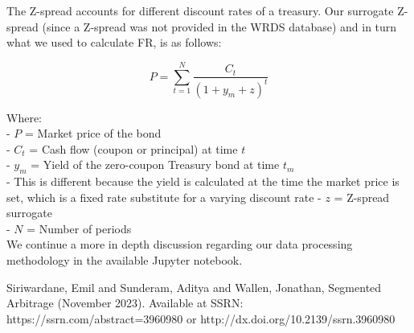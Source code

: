 \documentclass[12pt]{article}
\begin{document}
The Z-spread accounts for different discount rates of a treasury. 
Our surrogate Z-spread (since a Z-spread was not provided in the WRDS database)
and in turn what we used to calculate FR, is as follows:

\begin{equation}
P = \sum_{t=1}^{N} \frac{C_t}{(1 + y_m + z)^t}
\end{equation}

Where: \\
- $P$ = Market price of the bond \\
- $C_t$ = Cash flow (coupon or principal) at time \( t \)  \\
- $y_m$ = Yield of the zero-coupon Treasury bond at time $t_m$ \\
\indent - This is different because the yield is calculated at the time the 
market price is set, which is a fixed rate substitute for a varying discount rate
- $z$ = Z-spread surrogate \\
- $N$ = Number of periods \\

We continue a more in depth discussion regarding our data processing methodology
in the available Jupyter notebook.

\newpage

Siriwardane, Emil and Sunderam, Aditya and Wallen, Jonathan, Segmented Arbitrage 
(November 2023). Available at SSRN: https://ssrn.com/abstract=3960980 or 
http://dx.doi.org/10.2139/ssrn.3960980
\end{document}
